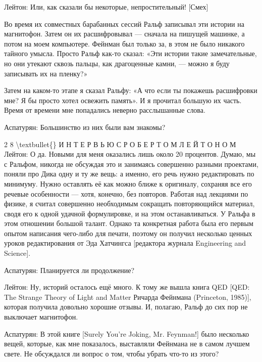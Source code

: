 \documentclass[10pt,oneside]{article}
\begin{document}
Лейтон: Или, как сказали бы некоторые, непростительный! [Смех]\par

Во время их совместных барабанных сессий Ральф записывал эти истории на магнитофон. Затем он их расшифровывал --- сначала на пишущей машинке, а потом на моем компьютере. Фейнман был только за, в этом не было никакого тайного умысла. Просто Ральф как-то сказал: «Эти истории такие замечательные, но они утекают сквозь пальцы, как драгоценные камни, --- можно я буду записывать их на пленку?»\par

Затем на каком-то этапе я сказал Ральфу: «А что если ты покажешь расшифровки мне? Я бы просто хотел освежить память». И я прочитал большую их часть. Время от времени мне попадались неверно расслышанные слова.\par

Аспатурян: Большинство из них были вам знакомы?\par

2 8 \textbackslash{}textbullet\{\} И Н Т Е Р В Ь Ю   С   Р О Б Е Р Т О М   Л Е Й Т О Н О М Лейтон: О да. Новыми для меня оказались лишь около 20 процентов. Думаю, мы с Ральфом, никогда не обсуждая это и занимаясь совершенно разными проектами, поняли про Дика одну и ту же вещь: а именно, его речь нужно редактировать по минимуму. Нужно оставлять её как можно ближе к оригиналу, сохраняя все его речевые особенности --- хотя, конечно, без повторов. Работая над лекциями по физике, я считал совершенно необходимым сокращать повторяющийся материал, сводя его к одной удачной формулировке, и на этом останавливаться. У Ральфа в этом отношении большой талант. Однако та конкретная работа была его первым опытом написания чего-либо для печати, поэтому он получил несколько ценных уроков редактирования от Эда Хатчингса [редактора журнала Engineering and Science].\par

Аспатурян: Планируется ли продолжение?\par

Лейтон: Ну, историй осталось ещё много. К тому же вышла книга QED [QED: The Strange Theory of Light and Matter Ричарда Фейнмана (Princeton, 1985)], которая получила довольно хорошие отзывы. И, полагаю, Ральф до сих пор не выключает магнитофон.\par

Аспатурян: В этой книге [Surely You’re Joking, Mr. Feynman!] было несколько вещей, которые, как мне показалось, выставляли Фейнмана не в самом лучшем свете. Не обсуждался ли вопрос о том, чтобы убрать что-то из этого?\par
\end{document}
